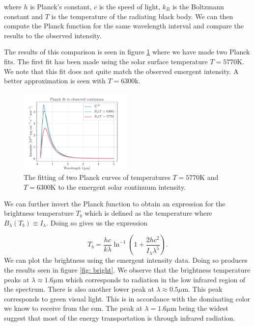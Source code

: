 \documentclass[a4paper,11.5pt,]{article}
\begin{document}
\begin{multicols}{2}
where $h$ is Planck's constant, $c$ is the speed of light, $k_B$ is the Boltzmann constant and $T$ is the temperature of the radiating black body.
We can then compute the Planck function for the same wavelength interval and compare the results to the observed intensity.

The results of this comparison is seen in figure \ref{fig: Planck} where we have made two Planck fits. The first fit has been made using the solar surface temperature $T = 5770$K. We note that this fit does not quite match the observed emergent intensity. A better approximation is seen with $T = 6300$k.

\begin{figure}[H]
    \centering
    \includegraphics[width = 0.5\textwidth]{figures/2.1/solarcontinuum_planckfit.pdf}
    \caption{The fitting of two Planck curves of temperatures $T = 5770$K and $T = 6300$K to the emergent solar continuum intensity.}
    \label{fig: Planck}
\end{figure}

We can further invert the Planck function to obtain an expression for the brightness temperature $T_b$ which is defined as the temperature where $B_\lambda(T_b) \equiv I_\lambda$. Doing so gives us the expression

\begin{equation}\label{eq: bright}
    T _ { b } = \frac { h c } { k \lambda } \ln ^ { - 1 } \left( 1 + \frac { 2 h c ^ { 2 } } { I _ { \lambda } \lambda ^ { 5 } } \right).
\end{equation}
We can plot the brightness using the emergent intensity data. Doing so produces the results seen in figure \ref{fig: bright}. We observe that the brightness temperature peaks at $\lambda \approx 1.6 \mu$m which corresponds to radiation in the low infrared region of the spectrum. There is also another lower peak at $\lambda \approx 0.5\mu$m. This peak corresponds to green visual light. This is in accordance with the dominating color we know to receive from the sun. The peak at $\lambda = 1.6 \mu$m being the widest suggest that most of the energy transportation is through infrared radiation.



\end{multicols}
\end{document}
